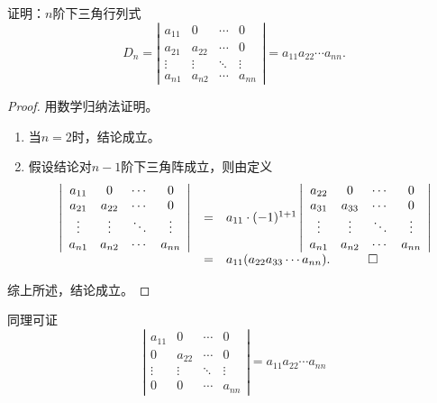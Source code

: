 \begin{li}
  证明：$n$阶下三角行列式
  $$
  D_n = \left|
    \begin{array}{cccc}
      a_{11}  &  0 & \cdots & 0 \\
      a_{21}  &  a_{22} & \cdots & 0 \\
      \vdots & \vdots & \ddots & \vdots\\  
      a_{n1}  &  a_{n2} & \cdots & a_{nn} 
    \end{array}
  \right| = a_{11} a_{22} \cdots a_{nn}.
  $$  
\end{li}
\begin{proof}
  用数学归纳法证明。
  \begin{enumerate}
  \item 当$n=2$时，结论成立。 
  \item 假设结论对$n-1$阶下三角阵成立，则由定义
    $$
    \begin{array}{rcl}
      \left|
      \begin{array}{cccc}
        a_{11}  &  0 & \cdots & 0 \\
        a_{21}  &  a_{22} & \cdots & 0 \\
        \vdots & \vdots & \ddots & \vdots\\  
        a_{n1}  &  a_{n2} & \cdots & a_{nn} 
      \end{array}
                                     \right| &=&  a_{11} \cdot (-1)^{1+1} \left|
                                                 \begin{array}{cccc}
                                                   a_{22}  &  0 & \cdots & 0 \\
                                                   a_{31}  &  a_{33} & \cdots & 0 \\
                                                   \vdots & \vdots & \ddots & \vdots\\  
                                                   a_{n1}  &  a_{n2} & \cdots & a_{nn} 
                                                 \end{array}
                                                                                \right| \\[0.1in]
                &=&  a_{11} (a_{22} a_{33} \cdots a_{nn}). \quad \qed        
    \end{array}
    $$    
  \end{enumerate}
  综上所述，结论成立。
\end{proof}

同理可证
$$
\left|
  \begin{array}{cccc}
    a_{11}  &  0 & \cdots & 0 \\
    0  &  a_{22} & \cdots & 0 \\
    \vdots & \vdots & \ddots & \vdots\\  
    0  &  0 & \cdots & a_{nn} 
  \end{array}
\right| = a_{11}a_{22}\cdots a_{nn}
$$

